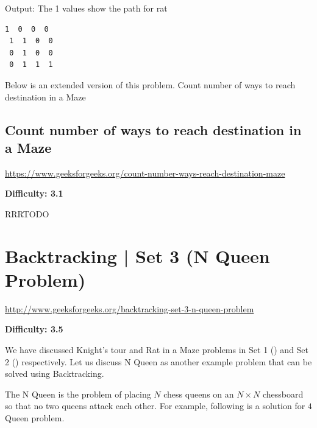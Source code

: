 Output: The 1 values show the path for rat
\begin{lstlisting}[style=rayio]
 1  0  0  0 
 1  1  0  0 
 0  1  0  0 
 0  1  1  1 
\end{lstlisting}
Below is an extended version of this problem. Count number of ways to reach
destination in a Maze


\subsection{Count number of ways to reach destination in a Maze
  \label{secGFGBktrckCountWaysMaze}}

\url{https://www.geeksforgeeks.org/count-number-ways-reach-destination-maze}

\textbf{Difficulty: 3.1}

RRRTODO


\textbf{}

\RayNotesBegin



\RayNotesEnd

\textbf{}



\section{Backtracking | Set 3 (N Queen Problem)
  \label{secGFGBktrckSet3NQueenProb}}

\url{http://www.geeksforgeeks.org/backtracking-set-3-n-queen-problem}

\textbf{Difficulty: 3.5}

We have discussed Knight's tour and Rat in a Maze problems in Set 1
() and Set 2
() respectively. Let us discuss N Queen
as another example problem that can be solved using Backtracking.

The N Queen is the problem of placing $N$ chess queens on an $N\times N$
chessboard so that no two queens attack each other. For example, following
is a solution for $4$ Queen problem.

